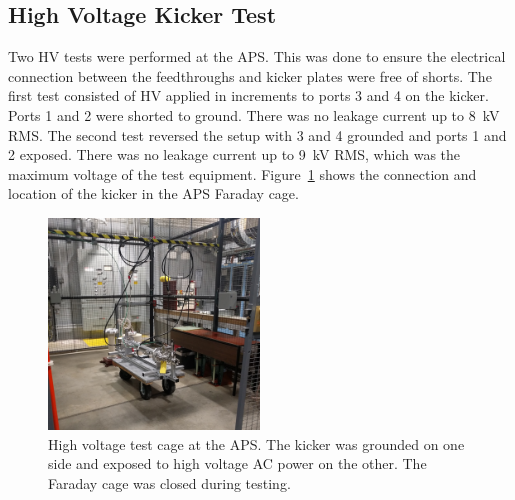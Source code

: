 \documentclass[aps,prab,preprint,groupedaddress,linenumbers]{revtex4-2}
\begin{document}
\subsection{High Voltage Kicker Test}
Two HV tests were performed at the APS. This was done to ensure the electrical connection 
between the feedthroughs and kicker plates were free of shorts. 
The first test consisted of HV applied in increments to ports 3 and 4 on the kicker.  
Ports 1 and 2 were shorted to ground. There was no leakage current up to \SI{8}{kV} RMS.
The second test reversed the setup with 3 and 4 grounded and ports 1 and 2 exposed. 
There was no leakage current up to \SI{9}{kV} RMS, which was the maximum voltage of the test equipment.
Figure~\ref{fig:AWAHVkicker} shows the connection and location of the kicker in the APS Faraday cage.
\begin{figure}%
	\begin{center}
		\includegraphics[width=0.5\textwidth]{kicker1}
		\caption{High voltage test cage at the APS. 
			The kicker was grounded on one side and exposed to high voltage AC power on the other. 
			The Faraday cage was closed during testing. }
		\label{fig:AWAHVkicker}
	\end{center}
\end{figure}
\end{document}
